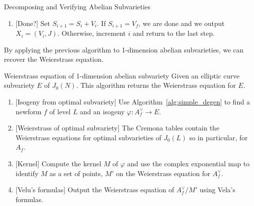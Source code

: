 \begin{algorithm}{Decomposing and Verifying Abelian Subvarieties}
\begin{enumerate}
\begin{enumerate}
                    Pick some $x\in V_f\setminus S_i$. Use
                    Algorithm~\ref{alg:simple_degen} to determine if there
                    exists $V_i$ such that $x\in V_i$, where $V_i$ is the image
                    of an integral linear combination of $\delta_j:A_f ^\vee
                    \to J_0(N)$. If not, then $V_f$ does not correspond to an
                    abelian subvariety and we are done.
                \item{} [Done?]
                    Set $S_{i+1} = S_i + V_i$. If $S_{i+1}=V_f$, we are done
                    and we output $X_i=(V_i, J)$. Otherwise, increment $i$ and
                    return to the last step.
            \end{enumerate}
    \end{enumerate}
\end{algorithm}

By applying the previous algorithm to 1-dimension abelian subvarieties, we can
recover the Weierstrass equation.

\begin{algorithm}{Weierstrass equation of 1-dimension abelian subvariety}%
    \label{alg:weierstrass}
    Given an elliptic curve subvariety $E$ of $J_0(N)$. This algorithm
    returns the Weierstrass equation for $E$.
    \begin{enumerate}
        \item{}
            [Isogeny from optimal subvariety] Use
            Algorithm~\ref{alg:simple_degen} to find a newform $f$ of level
            $L$ and an isogeny $\varphi:A_f ^\vee\to E$.
        \item{}
            [Weierstrass of optimal subvariety] The Cremona tables contain the
            Weierstrass equations for optimal subvarieties of $J_0(L)$ so in
            particular, for $A_f$.
        \item{}
            [Kernel] Compute the kernel $M$ of $\varphi$ and use the complex
            exponential map to identify $M$ as a set of points, $M'$ on the
            Weierstrass equation for $A_f ^\vee$.
        \item{}
            [Velu's formulas] Output the Weierstrass equation of $A_f ^\vee/M'$ using
            Vela's formulas.
    \end{enumerate}
\end{algorithm}

